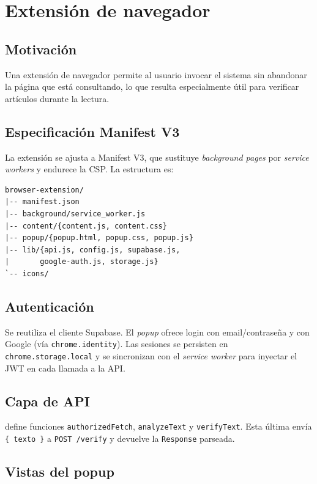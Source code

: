 \chapter{Extensión de navegador}\label{cap:extension}

\section{Motivación}

Una extensión de navegador permite al usuario invocar el sistema sin
abandonar la página que está consultando, lo que resulta especialmente
útil para verificar artículos durante la lectura.

\section{Especificación Manifest V3}

La extensión se ajusta a Manifest V3, que sustituye \emph{background
pages} por \emph{service workers} y endurece la CSP. La estructura es:

\begin{lstlisting}[caption={Layout de la extension}]
browser-extension/
|-- manifest.json
|-- background/service_worker.js
|-- content/{content.js, content.css}
|-- popup/{popup.html, popup.css, popup.js}
|-- lib/{api.js, config.js, supabase.js,
|       google-auth.js, storage.js}
`-- icons/
\end{lstlisting}

\section{Autenticación}

Se reutiliza el cliente Supabase. El \emph{popup} ofrece login con
email/contraseña y con Google (vía \texttt{chrome.identity}). Las
sesiones se persisten en \texttt{chrome.storage.local} y se
sincronizan con el \emph{service worker} para inyectar el JWT en cada
llamada a la API.

\section{Capa de API}

 define funciones \texttt{authorizedFetch},
\texttt{analyzeText} y \texttt{verifyText}. Esta última envía
\texttt{\{ texto \}} a \texttt{POST /verify} y devuelve la
\texttt{Response} parseada.

\section{Vistas del popup}


